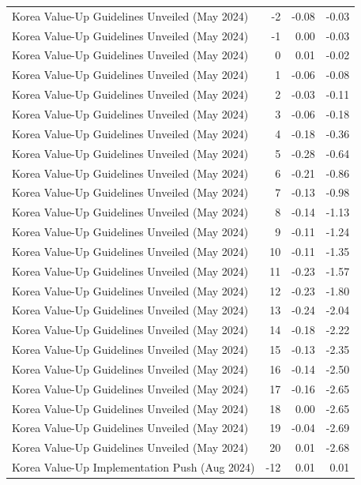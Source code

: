 \begin{table}
\begin{tabular}{lrrr}
Korea Value-Up Guidelines Unveiled (May 2024) & -2 & -0.08 & -0.03 \\
Korea Value-Up Guidelines Unveiled (May 2024) & -1 & 0.00 & -0.03 \\
Korea Value-Up Guidelines Unveiled (May 2024) & 0 & 0.01 & -0.02 \\
Korea Value-Up Guidelines Unveiled (May 2024) & 1 & -0.06 & -0.08 \\
Korea Value-Up Guidelines Unveiled (May 2024) & 2 & -0.03 & -0.11 \\
Korea Value-Up Guidelines Unveiled (May 2024) & 3 & -0.06 & -0.18 \\
Korea Value-Up Guidelines Unveiled (May 2024) & 4 & -0.18 & -0.36 \\
Korea Value-Up Guidelines Unveiled (May 2024) & 5 & -0.28 & -0.64 \\
Korea Value-Up Guidelines Unveiled (May 2024) & 6 & -0.21 & -0.86 \\
Korea Value-Up Guidelines Unveiled (May 2024) & 7 & -0.13 & -0.98 \\
Korea Value-Up Guidelines Unveiled (May 2024) & 8 & -0.14 & -1.13 \\
Korea Value-Up Guidelines Unveiled (May 2024) & 9 & -0.11 & -1.24 \\
Korea Value-Up Guidelines Unveiled (May 2024) & 10 & -0.11 & -1.35 \\
Korea Value-Up Guidelines Unveiled (May 2024) & 11 & -0.23 & -1.57 \\
Korea Value-Up Guidelines Unveiled (May 2024) & 12 & -0.23 & -1.80 \\
Korea Value-Up Guidelines Unveiled (May 2024) & 13 & -0.24 & -2.04 \\
Korea Value-Up Guidelines Unveiled (May 2024) & 14 & -0.18 & -2.22 \\
Korea Value-Up Guidelines Unveiled (May 2024) & 15 & -0.13 & -2.35 \\
Korea Value-Up Guidelines Unveiled (May 2024) & 16 & -0.14 & -2.50 \\
Korea Value-Up Guidelines Unveiled (May 2024) & 17 & -0.16 & -2.65 \\
Korea Value-Up Guidelines Unveiled (May 2024) & 18 & 0.00 & -2.65 \\
Korea Value-Up Guidelines Unveiled (May 2024) & 19 & -0.04 & -2.69 \\
Korea Value-Up Guidelines Unveiled (May 2024) & 20 & 0.01 & -2.68 \\
Korea Value-Up Implementation Push (Aug 2024) & -12 & 0.01 & 0.01 \\

\end{tabular}
\end{table}
